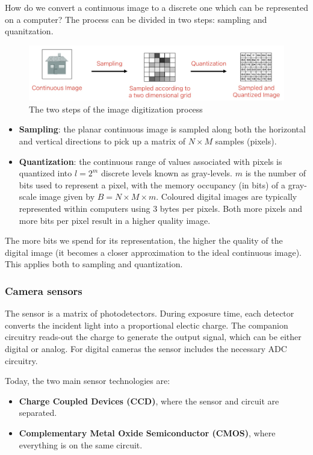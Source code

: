 How do we convert a continuous image to a discrete one which can be represented on a computer? 
The process can be divided in two steps: sampling and quanitzation.

\begin{figure}[htbp]
  \centering
  \includegraphics[width=0.55\linewidth]{./img/image_digitization.jpg}
  \caption{The two steps of the image digitization process}
  \label{fig:image_digitization}
\end{figure}

\begin{itemize}
  \item \textbf{Sampling}: the planar continuous image is sampled along both the horizontal and vertical directions to pick up a matrix of $N\times M$ samples (pixels).
  \item \textbf{Quantization}: the continuous range of values associated with pixels is quantized into $l=2^m$ discrete levels known as gray-levels.
  $m$ is the number of bits used to represent a pixel, with the memory occupancy (in bits) of a gray-scale image given by $B = N \times M \times m$. Coloured digital images are typically represented within computers using 3 bytes per pixels. Both more pixels and more bits per pixel result in a higher quality image.
\end{itemize}

The more bits we spend for its representation, the higher the quality of the digital image (it becomes a closer approximation to the ideal continuous image).
This applies both to sampling and quantization.

\subsubsection{Camera sensors}

The sensor is a matrix of photodetectors.
During exposure time, each detector converts the incident light into a proportional electic charge.
The companion circuitry reads-out the charge to generate the output signal, which can be either digital or analog.
For digital cameras the sensor includes the necessary ADC circuitry.

Today, the two main sensor technologies are:
\begin{itemize}
  \item \textbf{Charge Coupled Devices (CCD)}, where the sensor and circuit are separated.
  \item \textbf{ Complementary Metal Oxide Semiconductor (CMOS)}, where everything is on the same circuit.
\end{itemize}

